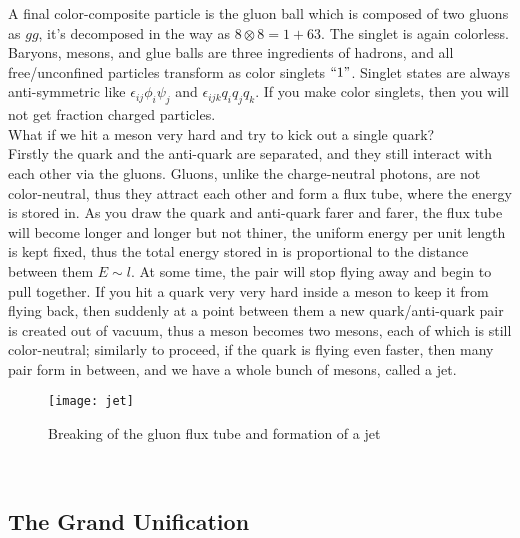 \documentclass{article}
\newcommand{\subsec}{\subsection}
\renewcommand{\1}{\left}
\renewcommand{\2}{\right}
\newcommand{\ep}{\epsilon}
\begin{document}
A final color-composite particle is the gluon ball which is composed of two gluons as $gg$, it's decomposed in the way as $8\otimes 8=1+63$. The singlet is again colorless.\\

Baryons, mesons, and glue balls are three ingredients of hadrons, and all free/unconfined particles transform as color singlets $``1"$. Singlet states are always anti-symmetric like $\ep_{ij}\phi_i\psi_j$ and $\ep_{ijk}q_iq_jq_k$. If you make color singlets, then you will not get fraction charged particles.\\

What if we hit a meson very hard and try to kick out a single quark?\\
Firstly the quark and the anti-quark are separated, and they still interact with each other via the gluons. Gluons, unlike the charge-neutral photons, are not color-neutral, thus they attract each other and form a flux tube, where the energy is stored in. As you draw the quark and anti-quark farer and farer, the flux tube will become longer and longer but not thiner, the uniform energy per unit length is kept fixed, thus the total energy stored in is proportional to the distance between them $E\sim l$. At some time, the pair will stop flying away and begin to pull together. If you hit a quark very very hard inside a meson to keep it from flying back, then suddenly at a point between them a new quark/anti-quark pair is created out of vacuum, thus a meson becomes two mesons, each of which is still color-neutral; similarly to proceed, if the quark is flying even faster, then many pair form in between, and we have a whole bunch of mesons, called a jet.
\begin{figure}[h]
\centering
\texttt{[image: jet]}
\caption{Breaking of the gluon flux tube and formation of a jet}
\end{figure}\\

\subsec{The Grand Unification}
\end{document}
